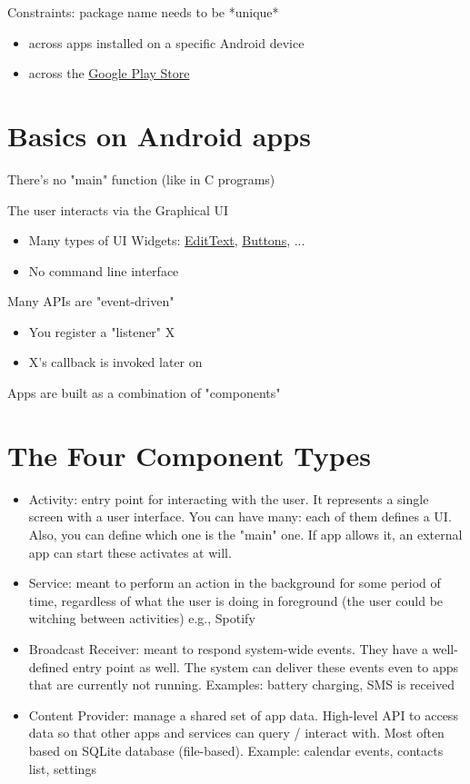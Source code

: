 \documentclass[11pt]{article}
\begin{document}
Constraints: package name needs to be *unique* 
\begin{itemize}
	\item across apps installed on a specific Android device
	\item across the \underline{Google Play Store}
\end{itemize}

\section*{Basics on Android apps}

There's no "main" function (like in C programs)

The user interacts via the Graphical UI
\begin{itemize}
	\item Many types of UI Widgets: \underline{EditText}, \underline{Buttons}, ...
	\item No command line interface
\end{itemize}

Many APIs are "event-driven"
\begin{itemize}
	\item You register a "listener" X
	\item X's callback is invoked later on
\end{itemize}

Apps are built as a combination of "components"


\section*{The Four Component Types}
\begin{itemize}
	\item Activity: entry point for interacting with the user. It represents a single screen with a user interface. You can have many: each of them defines a UI. Also, you can define which one is the "main" one. If app allows it, an external app can start these activates at will.
	\item Service: meant to perform an action in the background for some period of time, regardless of what the user is doing in foreground (the user could be witching between activities) e.g., Spotify
	\item Broadcast Receiver: meant to respond system-wide events. They have a well-defined entry point as well. The system can deliver these events even to apps that are currently not running. Examples: battery charging, SMS is received
	\item Content Provider: manage a shared set of app data. High-level API to access data so that other apps and services can query / interact with. Most often based on SQLite database (file-based). Example: calendar events, contacts list, settings
\end{itemize}
\end{document}
